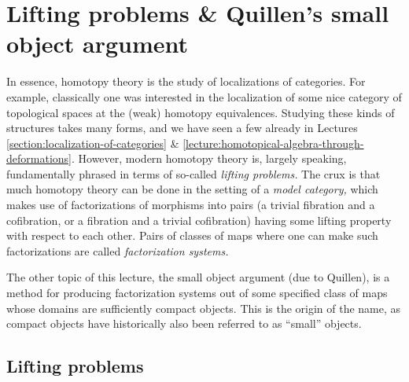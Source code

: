 

\section{Lifting problems \& Quillen's small object argument}\label{lecture:lifting-problems}

In essence, homotopy theory is the study of localizations of categories. For example, classically one was interested in the localization of some nice category of topological spaces
at the (weak) homotopy equivalences. Studying these kinds of structures takes many forms, and we have seen a few already in Lectures
\ref{section:localization-of-categories} \& \ref{lecture:homotopical-algebra-through-deformations}. However, modern homotopy theory is, largely speaking, fundamentally phrased in terms of
so-called \emph{lifting problems.} The crux is that much homotopy theory can be done in the setting of a \emph{model category,} which makes use of factorizations of morphisms into pairs
(a trivial fibration and a cofibration, or a fibration and a trivial cofibration) having some lifting property with respect to each other. Pairs of classes of maps where one can make such
factorizations are called \emph{factorization systems.}

The other topic of this lecture, the small object argument (due to Quillen), is a method for producing factorization systems out of some specified class of maps whose domains
are sufficiently compact objects. This is the origin of the name, as compact objects have historically also been referred to as ``small'' objects.

\subsection{Lifting problems}

